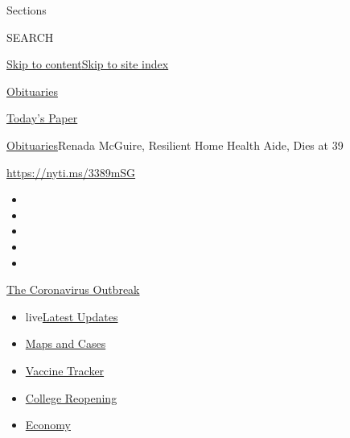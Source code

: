 Sections

SEARCH

\protect\hyperlink{site-content}{Skip to
content}\protect\hyperlink{site-index}{Skip to site index}

\href{https://www.nytimes3xbfgragh.onion/section/obituaries}{Obituaries}

\href{https://myaccount.nytimes3xbfgragh.onion/auth/login?response_type=cookie\&client_id=vi}{}

\href{https://www.nytimes3xbfgragh.onion/section/todayspaper}{Today's
Paper}

\href{/section/obituaries}{Obituaries}\textbar{}Renada McGuire,
Resilient Home Health Aide, Dies at 39

\url{https://nyti.ms/3389mSG}

\begin{itemize}
\item
\item
\item
\item
\item
\end{itemize}

\href{https://www.nytimes3xbfgragh.onion/news-event/coronavirus?action=click\&pgtype=Article\&state=default\&region=TOP_BANNER\&context=storylines_menu}{The
Coronavirus Outbreak}

\begin{itemize}
\tightlist
\item
  live\href{https://www.nytimes3xbfgragh.onion/2020/08/04/world/coronavirus-covid-19.html?action=click\&pgtype=Article\&state=default\&region=TOP_BANNER\&context=storylines_menu}{Latest
  Updates}
\item
  \href{https://www.nytimes3xbfgragh.onion/interactive/2020/us/coronavirus-us-cases.html?action=click\&pgtype=Article\&state=default\&region=TOP_BANNER\&context=storylines_menu}{Maps
  and Cases}
\item
  \href{https://www.nytimes3xbfgragh.onion/interactive/2020/science/coronavirus-vaccine-tracker.html?action=click\&pgtype=Article\&state=default\&region=TOP_BANNER\&context=storylines_menu}{Vaccine
  Tracker}
\item
  \href{https://www.nytimes3xbfgragh.onion/2020/08/02/us/covid-college-reopening.html?action=click\&pgtype=Article\&state=default\&region=TOP_BANNER\&context=storylines_menu}{College
  Reopening}
\item
  \href{https://www.nytimes3xbfgragh.onion/live/2020/08/03/business/stock-market-today-coronavirus?action=click\&pgtype=Article\&state=default\&region=TOP_BANNER\&context=storylines_menu}{Economy}
\end{itemize}

